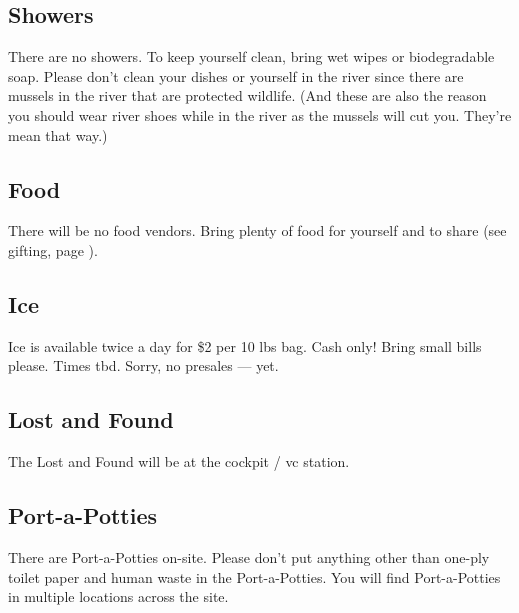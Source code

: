 \begin{multicols}{2}
\subsection*{Showers}
There are no showers. To keep yourself clean, bring wet wipes or biodegradable soap.
Please don't clean your dishes or yourself in the river since there are mussels in the river that are protected wildlife.  (And these are also the reason you should wear river shoes while in the river as the mussels will cut you.  They're mean that way.)

\subsection*{Food}
There will be no food vendors. Bring plenty of food for yourself and to share (see \gls{gifting}, page \pageref{gifting}).

\subsection*{Ice}
Ice is available twice a day for \$2 per 10 lbs bag.  Cash only! Bring small bills please. 
Times tbd. Sorry, no presales --- yet.

\subsection*{Lost and Found}
The Lost and Found will be at the \gls{cockpit} / \gls{vc} station.

\subsection*{Port-a-Potties}
There are Port-a-Potties on-site. Please don't put anything other than one-ply toilet paper and human waste in the Port-a-Potties. You will find Port-a-Potties in multiple locations across the site.




\end{multicols}
